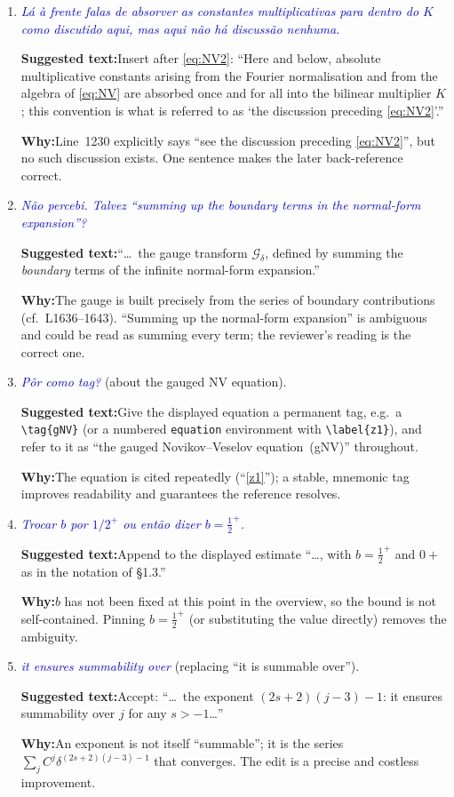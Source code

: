 \documentclass[11pt]{article}
\newcommand{\Gc}{\mathcal{G}}
\newcommand{\com}[1]{\textit{\textcolor{blue}{#1}}}
\newcommand{\sugg}[1]{\par\smallskip\textbf{Suggested text:}\quad #1}
\newcommand{\why}[1]{\par\smallskip\textbf{Why:}\quad #1\par\medskip}
\begin{document}
\begin{enumerate}[leftmargin=*]
\item[\textbf{L864}] \com{L\'a \`a frente falas de absorver as constantes
multiplicativas para dentro do $K$ como discutido aqui, mas aqui n\~ao h\'a
discuss\~ao nenhuma.}
\sugg{Insert after \eqref{eq:NV2}: ``Here and below, absolute multiplicative
constants arising from the Fourier normalisation and from the algebra of
\eqref{eq:NV} are absorbed once and for all into the bilinear multiplier $K$;
this convention is what is referred to as `the discussion preceding
\eqref{eq:NV2}'.''}
\why{Line~1230 explicitly says ``see the discussion preceding
\eqref{eq:NV2}'', but no such discussion exists. One sentence makes the later
back-reference correct.}

\item[\textbf{L873 (a)}] \com{N\~ao percebi. Talvez ``summing up the boundary
terms in the normal-form expansion''?}
\sugg{``\dots\ the gauge transform $\Gc_\delta$, defined by summing the
\emph{boundary} terms of the infinite normal-form expansion.''}
\why{The gauge is built precisely from the series of boundary contributions
(cf.\ L1636--1643). ``Summing up the normal-form expansion'' is ambiguous and
could be read as summing every term; the reviewer's reading is the correct
one.}

\item[\textbf{L873 (b)}] \com{P\^or como tag?} (about the gauged NV equation).
\sugg{Give the displayed equation a permanent tag, e.g.\ a
\texttt{\textbackslash tag\{gNV\}} (or a numbered \texttt{equation}
environment with \texttt{\textbackslash label\{z1\}}), and refer to it as
``the gauged Novikov--Veselov equation~(gNV)'' throughout.}
\why{The equation is cited repeatedly (``\eqref{z1}''); a stable, mnemonic tag
improves readability and guarantees the reference resolves.}

\item[\textbf{L887}] \com{Trocar $b$ por $1/2^+$ ou ent\~ao dizer
$b=\tfrac12^+$.}
\sugg{Append to the displayed estimate ``\dots, with $b=\tfrac12^{+}$ and
$0+$ as in the notation of \S1.3.''}
\why{$b$ has not been fixed at this point in the overview, so the bound is
not self-contained. Pinning $b=\tfrac12^{+}$ (or substituting the value
directly) removes the ambiguity.}

\item[\textbf{L888}] \com{it ensures summability over} (replacing ``it is
summable over'').
\sugg{Accept: ``\dots\ the exponent $(2s+2)(j-3)-1$: it ensures summability
over $j$ for any $s>-1$\dots''}
\why{An exponent is not itself ``summable''; it is the series
$\sum_j C^j\delta^{(2s+2)(j-3)-1}$ that converges. The edit is a precise and
costless improvement.}


\end{enumerate}
\end{document}
